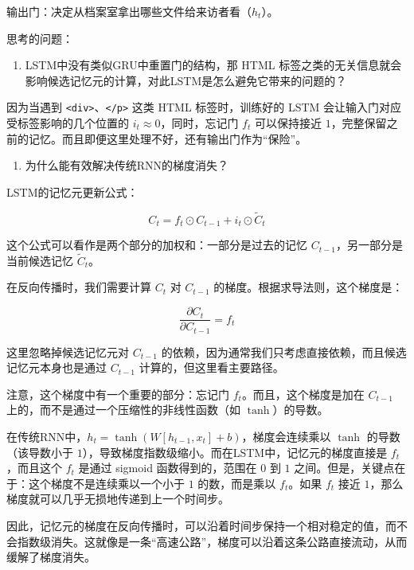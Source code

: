 输出门：决定从档案室拿出哪些文件给来访者看（\(h_t\)）。

思考的问题：

\begin{enumerate}
\def\labelenumi{\arabic{enumi}.}
\tightlist
\item
  LSTM中没有类似GRU中重置门的结构，那 HTML 标签之类的无关信息就会影响候选记忆元的计算，对此LSTM是怎么避免它带来的问题的？
\end{enumerate}

因为当遇到 \texttt{\textless{}div\textgreater{}}、\texttt{\textless{}/p\textgreater{}} 这类 HTML 标签时，训练好的 LSTM 会让输入门对应受标签影响的几个位置的 \(i_t \approx 0\)，同时，忘记门 \(f_t\) 可以保持接近 \(1\)，完整保留之前的记忆。而且即便这里处理不好，还有输出门作为``保险''。

\begin{enumerate}
\def\labelenumi{\arabic{enumi}.}
\setcounter{enumi}{1}
\tightlist
\item
  为什么能有效解决传统RNN的梯度消失？
\end{enumerate}

LSTM的记忆元更新公式：

\[
C_t = f_t \odot C_{t-1} + i_t \odot \tilde{C}_t
\]

这个公式可以看作是两个部分的加权和：一部分是过去的记忆 \(C_{t-1}\)，另一部分是当前候选记忆 \(\tilde{C}_t\)。

在反向传播时，我们需要计算 \(C_t\) 对 \(C_{t-1}\) 的梯度。根据求导法则，这个梯度是：

\[
\frac{\partial C_t}{\partial C_{t-1}} = f_t
\]

这里忽略掉候选记忆元对 \(C_{t-1}\) 的依赖，因为通常我们只考虑直接依赖，而且候选记忆元本身也是通过 \(C_{t-1}\) 计算的，但这里看主要路径。

注意，这个梯度中有一个重要的部分：忘记门 \(f_t\)。而且，这个梯度是加在 \(C_{t-1}\) 上的，而不是通过一个压缩性的非线性函数（如 \(\tanh\)）的导数。

在传统RNN中，\(h_t = \tanh(W [h_{t-1}, x_t] + b)\)，梯度会连续乘以 \(\tanh\) 的导数（该导数小于 \(1\)），导致梯度指数级缩小。而在LSTM中，记忆元的梯度直接是 \(f_t\)，而且这个 \(f_t\) 是通过 sigmoid 函数得到的，范围在 \(0\) 到 \(1\) 之间。但是，关键点在于：这个梯度不是连续乘以一个小于 \(1\) 的数，而是乘以 \(f_t\)。如果 \(f_t\) 接近 \(1\)，那么梯度就可以几乎无损地传递到上一个时间步。

因此，记忆元的梯度在反向传播时，可以沿着时间步保持一个相对稳定的值，而不会指数级消失。这就像是一条``高速公路''，梯度可以沿着这条公路直接流动，从而缓解了梯度消失。

